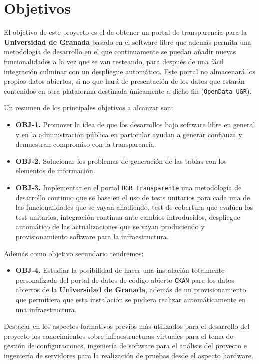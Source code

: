 \chapter{Objetivos}

El objetivo de este proyecto es el de obtener un portal de transparencia para la \textbf{Universidad de Granada} basado en el software libre que además permita una metodología de desarrollo en el que continuamente se puedan añadir nuevas funcionalidades a la vez que se van testeando, para después de una fácil integración culminar con un despliegue automático. Este portal no almacenará los propios datos abiertos, si no que hará de presentación de los datos que estarán contenidos en otra plataforma destinada únicamente a dicho fin ({\tt OpenData UGR}).

\bigskip
Un resumen de los principales objetivos a alcanzar son:

\begin{itemize}
  \item \textbf{OBJ-1.} Promover la idea de que los desarrollos bajo software libre en general y en la administración pública en particular ayudan a generar confianza y demuestran compromiso con la transparencia.
  \item \textbf{OBJ-2.} Solucionar los problemas de generación de las tablas con los elementos de información.
  \item \textbf{OBJ-3.} Implementar en el portal {\tt UGR Transparente} una metodología de desarrollo continuo que se base en el uso de tests unitarios para cada una de las funcionalidades que se vayan añadiendo, test de cobertura que evalúen los test unitarios, integración continua ante cambios introducidos, despliegue automático de las actualizaciones que se vayan produciendo y provisionamiento software para la infraestructura.
\end{itemize}

Además como objetivo secundario tendremos:

\begin{itemize}
  \item \textbf{OBJ-4.} Estudiar la posibilidad de hacer una instalación totalmente personalizada del portal de datos de código abierto {\tt CKAN} para los datos abiertos de la \textbf{Universidad de Granada}, además de un provisionamiento que permitiera que esta instalación se pudiera realizar automáticamente en una infraestructura.
\end{itemize}

\bigskip
Destacar en los aspectos formativos previos más utilizados para el desarrollo del proyecto los conocimientos sobre infraestructuras virtuales para el tema de gestión de configuraciones, ingeniería de software para el análisis del proyecto e ingeniería de servidores para la realización de pruebas desde el aspecto hardware.

